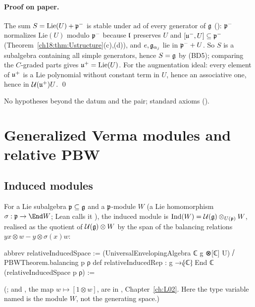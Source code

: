 \paragraph{Proof on paper.}  The sum $S=\mathrm{Lie}(U)+\mathfrak{p}^-$ is stable under $\mathrm{ad}$ of every generator of $\mathfrak{g}$
(): $\mathfrak{p}^-$ normalizes $\mathrm{Lie}(U)$ modulo $\mathfrak{p}^-$ because $\mathfrak{l}$ preserves $U$ and
$[\mathfrak{u}^-,U]\subseteq\mathfrak{p}^-$ (Theorem~\ref{ch18:thm:Ustructure}(c),(d)), and $e,\mathfrak{g}_{\alpha_j}$ lie in $\mathfrak{p}^-+U$.  So $S$ is a subalgebra containing
all simple generators, hence $S=\mathfrak{g}$ by (BD5); comparing the $C$-graded parts gives $\mathfrak{u}^+=\mathrm{Lie}(U)$.  For the augmentation
ideal: every element of $\mathfrak{u}^+$ is a Lie polynomial without constant term in $U$, hence an associative one, hence in $\mathcal U(\mathfrak{u}^+)U$. \qed
\begin{status}No hypotheses beyond the datum and the pair; standard axioms ().\end{status}

\section{Generalized Verma modules and relative PBW}\label{ch18:sec:verma}

\subsection{Induced modules}

For a Lie subalgebra $\mathfrak{p}\subseteq\mathfrak{g}$ and a $\mathfrak{p}$-module $W$ (a Lie homomorphism $\sigma:\chXVIIIp\to\End W$; Lean calls it ), the induced module is
$\mathrm{Ind}(W)=\mathcal U(\mathfrak{g})\otimes_{U(\mathfrak{p})}W$, realised as the quotient of $\mathcal U(\mathfrak{g})\otimes W$ by the span of the balancing relations
$yx\otimes w-y\otimes\sigma(x)w$:
\begin{leancode}
abbrev relativeInducedSpace :=
  (UniversalEnvelopingAlgebra ℂ g ⊗[ℂ] U) ⧸ PBWTheorem.balancing p ρ
def relativeInducedRep : g →ₗ⁅ℂ⁆ End ℂ (relativeInducedSpace p ρ) :=
\end{leancode}
(;  and , the
map $w\mapsto[1\otimes w]$, are in , Chapter~\ref{ch:L02}.  Here the type
variable named  is the module $W$, not the generating space.)

